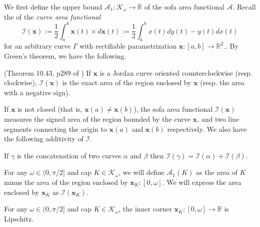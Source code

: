 We first define the upper bound \(\mathcal{A}_1 : \mathcal{K}_\omega \to \mathbb{R}\) of the sofa area functional \(\mathcal{A}\). Recall the  of the \emph{curve area functional}
\[
\mathcal{I}(\mathbf{x}) := \frac{1}{2} \int_a^b \mathbf{x}(t) \times d\mathbf{x}(t) := \frac{1}{2} \int_a^b x(t) dy(t) - y(t) dx(t)
\]
for an arbitrary curve \(\Gamma\) with rectifiable parametrization \(\mathbf{x} : [a, b] \to \mathbb{R}^2\).. By Green’s theorem, we have the following.

\begin{proposition}

(Theorem 10.43, p289 of \autocite{apostol2000visual}) If \(\mathbf{x}\) is a Jordan curve oriented counterclockwise (resp. clockwise), \(\mathcal{I}(\mathbf{x})\) is the exact area of the region enclosed by \(\mathbf{x}\) (resp. the area with a negative sign).

\label{pro:curve-area-functional-area}
\end{proposition}

If \(\mathbf{x}\) is not closed (that is, \(\mathbf{x}(a) \neq \mathbf{x}(b)\)), the sofa area functional \(\mathcal{I}(\mathbf{x})\) measures the signed area of the region bounded by the curve \(\mathbf{x}\), and two line segments connecting the origin to \(\mathbf{x}(a)\) and \(\mathbf{x}(b)\) respectively. We also have the following additivity of \(\mathcal{I}\).

\begin{proposition}

If \(\gamma\) is the concatenation of two curves \(\alpha\) and \(\beta\) then \(\mathcal{I}(\gamma) = \mathcal{I}(\alpha) + \mathcal{I}(\beta)\).

\label{pro:curve-area-functional-additive}
\end{proposition}

For any \(\omega \in (0, \pi/2]\) and cap \(K \in \mathcal{K}_\omega\), we will define \(\mathcal{A}_1(K)\) as the area of \(K\) minus the area of the region enclosed by \(\mathbf{x}_K : [0, \omega]\). We will express the area enclosed by \(\mathbf{x}_K\) as \(\mathcal{I}(\mathbf{x}_K)\).

\begin{proposition}

For any \(\omega \in (0, \pi/2]\) and cap \(K \in \mathcal{K}_\omega\), the inner corner \(\mathbf{x}_K : [0, \omega] \to \mathbb{R}\) is Lipschitz.

\label{pro:inner-corner-lipschitz}
\end{proposition}

